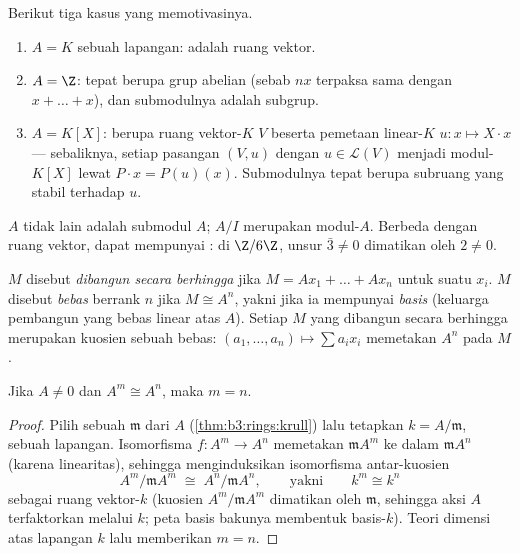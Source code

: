 \begin{example}\label{ex:b3:modules:examples}
Berikut tiga kasus yang memotivasinya.
\begin{enumerate}
  \item $A = K$ sebuah lapangan:  adalah ruang vektor.
  \item $A = \Z$:  tepat berupa grup abelian (sebab $nx$
        terpaksa sama dengan $x + \dots + x$), dan submodulnya adalah subgrup.
  \item $A = K[X]$:  berupa ruang vektor-$K$ $V$ beserta
        pemetaan linear-$K$ $u\colon x \mapsto X\cdot x$ ---
        sebaliknya, setiap pasangan $(V, u)$ dengan $u \in \mathcal L(V)$
        menjadi modul-$K[X]$ lewat $P \cdot x = P(u)(x)$.
        Submodulnya tepat berupa subruang yang stabil terhadap $u$.
\end{enumerate}
 $A$ tidak lain adalah submodul $A$; 
$A/I$ merupakan modul-$A$. Berbeda dengan ruang vektor,  dapat mempunyai
\emph{}: di $\Z/6\Z$, unsur $\bar 3 \ne 0$ dimatikan
oleh $2 \neq 0$.
\end{example}

\begin{definition}\label{def:b3:modules:free}
 $M$ disebut \emph{dibangun secara berhingga} jika
$M = Ax_1 + \dots + Ax_n$ untuk suatu $x_i$.  $M$ disebut
\emph{bebas} berrank $n$ jika $M \cong A^n$,
yakni jika ia mempunyai \emph{basis} (keluarga pembangun yang
bebas linear atas $A$). Setiap $M$ yang dibangun secara berhingga merupakan
kuosien sebuah  bebas: $(a_1, \dots, a_n) \mapsto \sum a_ix_i$
memetakan $A^n$ pada $M$.
\end{definition}

\begin{proposition}\label{prop:b3:modules:rank}
Jika $A \neq 0$ dan $A^m \cong A^n$, maka $m = n$.
\end{proposition}

\begin{proof}
Pilih sebuah  $\mathfrak m$ dari $A$ (\cref{thm:b3:rings:krull})
lalu tetapkan $k = A/\mathfrak m$, sebuah lapangan. Isomorfisma $f \colon A^m
\to A^n$ memetakan $\mathfrak m A^m$ ke dalam $\mathfrak m A^n$
(karena linearitas), sehingga menginduksikan isomorfisma antar-kuosien
\[
A^m/\mathfrak m A^m \;\cong\; A^n/\mathfrak m A^n,
\qquad\text{yakni}\qquad k^m \cong k^n
\]
sebagai ruang vektor-$k$ (kuosien $A^m/\mathfrak m A^m$
dimatikan oleh $\mathfrak m$, sehingga aksi $A$ terfaktorkan melalui $k$;
peta basis bakunya membentuk basis-$k$). Teori dimensi
atas lapangan $k$ lalu memberikan $m = n$.
\end{proof}

